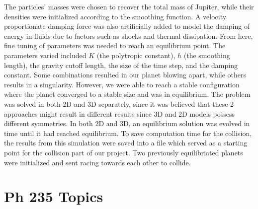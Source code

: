 \documentclass[12pt]{article}
\begin{document}
\newline\indent
The particles' masses were chosen to recover the total mass of Jupiter, while their densities were initialized according to the smoothing function. A velocity proportionate damping force was also artificially added to model the damping of energy in fluids due to factors such as shocks and thermal dissipation. From here, fine tuning of parameters was needed to reach an equilibrium point. The parameters varied included $K$ (the polytropic constant), $h$ (the smoothing length), the gravity cutoff length, the size of the time step, and the damping constant. Some combinations resulted in our planet blowing apart, while others results in a singularity. However, we were able to reach a stable configuration where the planet converged to a stable size and was in equilibrium.
\newline\indent
The problem was solved in both 2D and 3D separately, since it was believed that these 2 approaches might result in different results since 3D and 2D models possess different symmetries.
\newline\indent
In both 2D and 3D, an equilibrium solution was evolved in time until it had reached equilibrium. To save computation time for the collision, the results from this simulation were saved into a file which served as a starting point for the collision part of our project. Two previously equilibriated planets were initialized and sent racing towards each other to collide.

\section{Ph 235 Topics}
\end{document}
